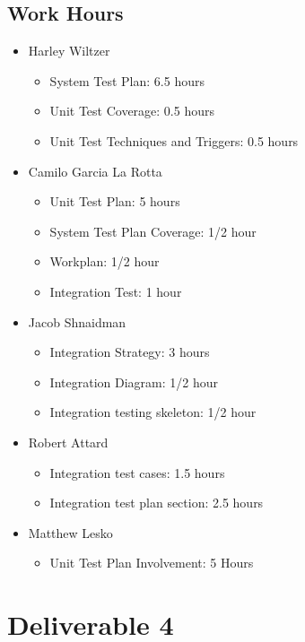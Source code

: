 \documentclass[12pt]{article}
\begin{document}
 \subsection{Work Hours}
%
 \begin{itemize}
     \item Harley Wiltzer
        \begin{itemize}
            \item System Test Plan: 6.5 hours
            \item Unit Test Coverage: 0.5 hours
            \item Unit Test Techniques and Triggers: 0.5 hours
        \end{itemize}
     \item Camilo Garcia La Rotta
        \begin{itemize}
            \item Unit Test Plan: 5 hours
            \item System Test Plan Coverage: 1/2 hour
            \item Workplan: 1/2 hour
            \item Integration Test: 1 hour
        \end{itemize}
     \item Jacob Shnaidman
     \begin{itemize}
         \item Integration Strategy: 3 hours
     \item Integration Diagram: 1/2 hour
     \item Integration testing skeleton: 1/2 hour
     \end{itemize}
     \item Robert Attard
     \begin{itemize}
        \item Integration test cases: 1.5 hours
        \item Integration test plan section: 2.5 hours
     \end{itemize}
     \item Matthew Lesko
     \begin{itemize}
        \item Unit Test Plan Involvement: 5 Hours
     \end{itemize}
 \end{itemize}
 
 \newpage

 \section{Deliverable 4}
\end{document}
